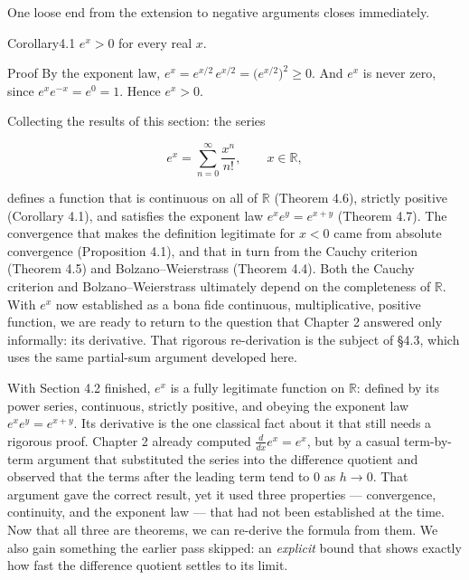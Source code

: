 \documentclass[a4paper,12pt,oneside]{memoir}
\begin{document}
One loose end from the extension to negative arguments closes immediately.

\begin{envcorollary}{Corollary}{4.1}{}
\(e^{x} > 0\) for every real \(x\).
\end{envcorollary}
\begin{envproof}{Proof}{}{}
By the exponent law, \(e^{x} = e^{x/2}\, e^{x/2} = \bigl(e^{x/2}\bigr)^{2} \ge 0\). And \(e^{x}\) is never zero, since \(e^{x} e^{-x} = e^{0} = 1\). Hence \(e^{x} > 0\). \qedmark
\end{envproof}
Collecting the results of this section: the series

\[ e^{x} = \sum_{n=0}^{\infty} \frac{x^{n}}{n!}, \qquad x \in \mathbb{R}, \]

defines a function that is continuous on all of \(\mathbb{R}\) (Theorem 4.6), strictly positive (Corollary 4.1), and satisfies the exponent law \(e^{x} e^{y} = e^{x + y}\) (Theorem 4.7). The convergence that makes the definition legitimate for \(x < 0\) came from absolute convergence (Proposition 4.1), and that in turn from the Cauchy criterion (Theorem 4.5) and Bolzano–Weierstrass (Theorem 4.4). Both the Cauchy criterion and Bolzano–Weierstrass ultimately depend on the completeness of \(\mathbb{R}\). With \(e^{x}\) now established as a bona fide continuous, multiplicative, positive function, we are ready to return to the question that Chapter 2 answered only informally: its derivative. That rigorous re-derivation is the subject of §4.3, which uses the same partial-sum argument developed here.


With Section 4.2 finished, \(e^{x}\) is a fully legitimate function on \(\mathbb{R}\): defined by its power series, continuous, strictly positive, and obeying the exponent law \(e^{x} e^{y} = e^{x + y}\). Its derivative is the one classical fact about it that still needs a rigorous proof. Chapter 2 already computed \(\frac{d}{dx} e^{x} = e^{x}\), but by a casual term-by-term argument that substituted the series into the difference quotient and observed that the terms after the leading term tend to \(0\) as \(h \to 0\). That argument gave the correct result, yet it used three properties — convergence, continuity, and the exponent law — that had not been established at the time. Now that all three are theorems, we can re-derive the formula from them. We also gain something the earlier pass skipped: an \emph{explicit} bound that shows exactly how fast the difference quotient settles to its limit.
\end{document}
